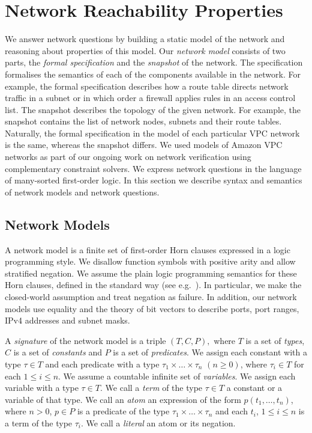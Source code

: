 \section{Network Reachability Properties}
\label{sect:aws/specification}
We answer network questions by building a static model of the network and reasoning about properties of this model. Our \emph{network model} consists of two parts, the \emph{formal specification} and the \emph{snapshot} of the network. The specification formalises the semantics of each of the components available in the network. For example, the formal specification describes how a route table directs network traffic in a subnet or in which order a firewall applies rules in an access control list. The snapshot describes the topology of the given network. For example, the snapshot contains the list of network nodes, subnets and their route tables. Naturally, the formal specification in the model of each particular VPC network is the same, whereas the snapshot differs. We used models of Amazon VPC networks as part of our ongoing work on network verification using complementary constraint solvers. We express network questions in the language of many-sorted first-order logic. In this section we describe syntax and semantics of network models and network questions.

\subsection{Network Models}
\label{sect:aws/reachability/spec}
A network model is a finite set of first-order Horn clauses expressed in a logic programming style. We disallow function symbols with positive arity and allow stratified negation. We assume the plain logic programming semantics for these Horn clauses, defined in the standard way (see e.g.~\cite{DBLP:books/sp/Lloyd87}). In particular, we make the closed-world assumption and treat negation as failure. In addition, our network models use equality and the theory of bit vectors to describe ports, port ranges, IPv4 addresses and subnet masks.

A \emph{signature} of the network model is a triple $(T, C, P),$ where $T$ is a set of \emph{types}, $C$ is a set of \emph{constants} and $P$ is a set of \emph{predicates}. We assign each constant with a type $\tau\in T$ and each predicate with a type $\tau_1\times\ldots\times\tau_n$ $(n\ge0)$, where $\tau_i\in T$ for each $1\leq i \leq n$. We assume a countable infinite set of \emph{variables}. We assign each variable with a type $\tau\in T$. We call a \emph{term} of the type $\tau\in T$ a constant or a variable of that type. We call an \emph{atom} an expression of the form $p(t_1,\ldots,t_n)$, where $n>0$, $p\in P$ is a predicate of the type $\tau_1\times\ldots\times\tau_n$ and each $t_i$, $1\leq i \leq n$ is a term of the type $\tau_i$. We call a \emph{literal} an atom or its negation.

